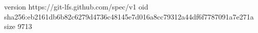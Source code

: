 version https://git-lfs.github.com/spec/v1
oid sha256:eb2161db6b82c6279d4736c48145e7d016a8cc79312a44df6f7787091a7e271a
size 9713

